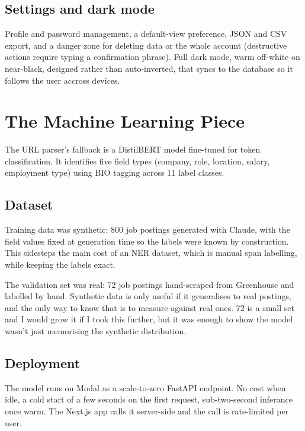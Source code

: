 \documentclass[11pt,a4paper]{article}
\begin{document}
\subsection{Settings and dark mode}

Profile and password management, a default-view preference, JSON and CSV
export, and a danger zone for deleting data or the whole account
(destructive actions require typing a confirmation phrase). Full dark
mode, warm off-white on near-black, designed rather than auto-inverted,
that syncs to the database so it follows the user accross devices.

\section{The Machine Learning Piece}

The URL parser's fallback is a DistilBERT model fine-tuned for token
classification. It identifies five field types (company, role, location,
salary, employment type) using BIO tagging across 11 label classes.

\subsection{Dataset}

Training data was synthetic: 800 job postings generated with Claude, with
the field values fixed at generation time so the labels were known by
construction. This sidesteps the main cost of an NER dataset, which is
manual span labelling, while keeping the labels exact.

The validation set was real: 72 job postings hand-scraped from Greenhouse
and labelled by hand. Synthetic data is only useful if it generalises to
real postings, and the only way to know that is to measure against real
ones. 72 is a small set and I would grow it if I took this further, but
it was enough to show the model wasn't just memorising the synthetic
distribution.

\subsection{Deployment}

The model runs on Modal as a scale-to-zero FastAPI endpoint. No cost when
idle, a cold start of a few seconds on the first request, sub-two-second
inferance once warm. The Next.js app calls it server-side and the call is
rate-limited per user.
\end{document}
